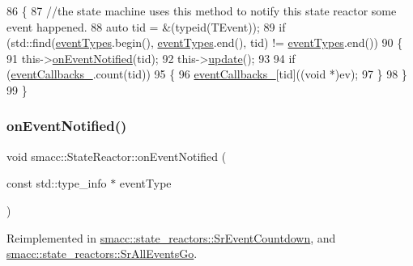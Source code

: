 \begin{DoxyCode}
86     \{
87         \textcolor{comment}{//the state machine uses this method to notify this state reactor some event happened.}
88         \textcolor{keyword}{auto} tid = &(\textcolor{keyword}{typeid}(TEvent));
89         \textcolor{keywordflow}{if} (std::find(\hyperlink{classsmacc_1_1StateReactor_a65c8ddfce40e7859e5c73fff1cf6c04b}{eventTypes}.begin(), \hyperlink{classsmacc_1_1StateReactor_a65c8ddfce40e7859e5c73fff1cf6c04b}{eventTypes}.end(), tid) != 
      \hyperlink{classsmacc_1_1StateReactor_a65c8ddfce40e7859e5c73fff1cf6c04b}{eventTypes}.end())
90         \{
91             this->\hyperlink{classsmacc_1_1StateReactor_a17646b3c68a6d80d1e4da8c14238ce36}{onEventNotified}(tid);
92             this->\hyperlink{classsmacc_1_1StateReactor_aca5d4f7af06532272db55943b7810a43}{update}();
93 
94             \textcolor{keywordflow}{if} (\hyperlink{classsmacc_1_1StateReactor_a63cce05c412f3699cc1b15af9aeaf8af}{eventCallbacks\_}.count(tid))
95             \{
96                 \hyperlink{classsmacc_1_1StateReactor_a63cce05c412f3699cc1b15af9aeaf8af}{eventCallbacks\_}[tid]((\textcolor{keywordtype}{void} *)ev);
97             \}
98         \}
99     \}
\end{DoxyCode}
\mbox{\label{classsmacc_1_1StateReactor_a17646b3c68a6d80d1e4da8c14238ce36}} 
\subsubsection{\texorpdfstring{on\+Event\+Notified()}{onEventNotified()}}
{\footnotesize\ttfamily void smacc\+::\+State\+Reactor\+::on\+Event\+Notified (\begin{DoxyParamCaption}\item[{const std\+::type\+\_\+info $\ast$}]{event\+Type }\end{DoxyParamCaption})\hspace{0.3cm}{\ttfamily [virtual]}}



Reimplemented in \hyperlink{classsmacc_1_1state__reactors_1_1SrEventCountdown_a6cc15cf6633bd882ac40a87d698b3b6b}{smacc\+::state\+\_\+reactors\+::\+Sr\+Event\+Countdown}, and \hyperlink{classsmacc_1_1state__reactors_1_1SrAllEventsGo_abd72dc79374c34111d24691c459850c2}{smacc\+::state\+\_\+reactors\+::\+Sr\+All\+Events\+Go}.



